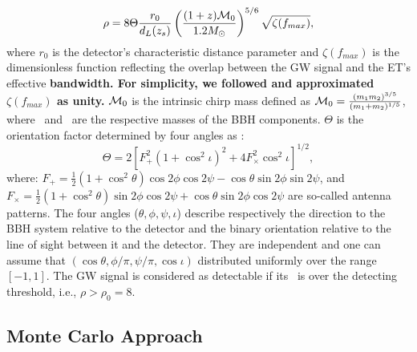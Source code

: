 \documentclass[twocolumn]{aastex62}
\begin{document}
\begin{equation} \label{SNR}
\rho = 8 \Theta \frac{r_0}{d_L(z_s)} \left( \frac{(1+z){\cal M}_0}{1.2 M_{\odot}} \right)^{5/6}
\sqrt {\zeta(f_{max})},
\end{equation}
where $r_0$ is the detector's characteristic distance parameter and $\zeta(f_{max})$ is the dimensionless function reflecting the overlap between the GW signal and the ET's effective {\bf bandwidth. For simplicity, we followed  \citet{Taylor2012} and approximated $\zeta(f_{max})$ as  unity.} ${\cal M}_0$ is the intrinsic chirp mass defined as $ {\cal M}_0 = \frac{(m_1m_2)^{3/5}}{(m_1+m_2)^{1/5}}$, where \mone\ and \mtwo\ are the
respective masses of the BBH components. $\Theta$ is the orientation factor determined by four angles as \citep{Finn93}:
 \begin{equation} \label{Theta}
 \Theta = 2 [ F_{+}^2(1 + \cos^2{\iota} )^2 + 4 F_{\times}^2 \cos^2{\iota} ]^{1/2},
 \end{equation}
where: $F_{+} = \frac{1}{2} (1 + \cos^2{\theta}) \cos{2\phi} \cos{2 \psi} - \cos{\theta} \sin{2 \phi} \sin{ 2 \psi}$, and
$F_{\times} = \frac{1}{2} (1 + \cos^2{\theta}) \sin{2\phi} \cos{2 \psi} + \cos{\theta} \sin{2 \phi} \cos{ 2 \psi}$ are so-called antenna patterns. The four angles ($\theta, \phi, \psi, \iota$) describe respectively the
direction to the BBH system relative to the detector and the binary orientation relative to the line of sight between it and the detector. 
They are independent and one can assume that $(\cos\theta, \phi/\pi, \psi/\pi, \cos\iota)$ distributed uniformly over the range $[-1, 1]$. The GW signal is considered as detectable if its \snr\ is over the detecting threshold, i.e., $\rho > \rho_0 = 8$.

\subsection{Monte Carlo Approach} \label{MC}
\end{document}

